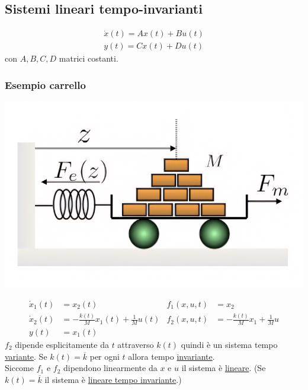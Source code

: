 \documentclass{article}
\numberwithin{equation}{subsection}
\let\oldsubsection\subsection%
\renewcommand{\subsection}{%
  \renewcommand{\theequation}{\thesubsection.\arabic{equation}}%
  \oldsubsection}%
\begin{document}
\subsection{Sistemi lineari tempo-invarianti}
\begin{align*}
    \dot x(t) = A x(t) + B u(t)\\
    y(t) = C x(t) + D u(t)
\end{align*}
con $A,B,C,D$ matrici costanti.


\subsubsection{Esempio carrello}
\begin{center}
    \includegraphics[scale=0.2]{Images/Es_carrello.png}
\end{center}
\begin{align*}
    \dot x_1(t) &= x_2(t) & f_1(x,u,t) &= x_2\\
    \dot x_2(t) &= - \frac{k(t)}{M}x_1(t) + \frac{1}{M} u(t) & f_2(x,u,t) &= - \frac{k(t)}{M}x_1 + \frac{1}{M}u\\
    y(t) &= x_1(t)
\end{align*}
$f_2$ dipende esplicitamente da $t$ attraverso $k(t)$ quindi è un sistema tempo \underline{variante}. Se $k(t) = \overline{k}$ per ogni $t$ allora tempo \underline{invariante}.\\
Siccome $f_1$ e $f_2$ dipendono linearmente da $x$ e $u$ il sistema è \underline{lineare}. (Se $k(t) = \overline{k}$ il sistema è \underline{lineare tempo invariante}.)
\end{document}
